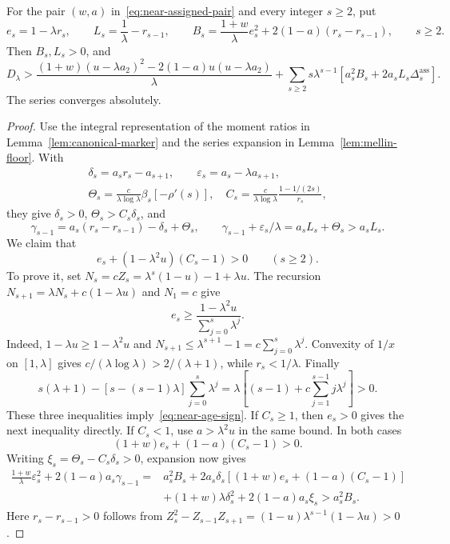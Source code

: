 \begin{lemma}\label{lem:near-absorption}
For the pair $(w,a)$ in~\eqref{eq:near-assigned-pair} and every integer $s\ge2$, put
\[
 e_s=1-\lambda r_s,\qquad L_s=\frac1\lambda-r_{s-1},\qquad
 B_s=\frac{1+w}{\lambda}e_s^2+2(1-a)(r_s-r_{s-1}),\qquad s\ge2.
\]
Then $B_s,L_s>0$, and
\begin{equation}\label{eq:near-root-floor}
 D_\lambda>
 \frac{(1+w)(u-\lambda a_2)^2-2(1-a)u(u-\lambda a_2)}\lambda
 +\sum_{s\ge2}s\lambda^{s-1}
       [a_s^2B_s+2a_sL_s\Delta_s^{\mathrm{ass}}].
\end{equation}
The series converges absolutely.
\end{lemma}
\begin{proof}
Use the integral representation of the moment ratios in Lemma~\ref{lem:canonical-marker} and the series expansion in Lemma~\ref{lem:mellin-floor}. With
\[\begin{gathered}
 \delta_s=a_sr_s-a_{s+1},\qquad \varepsilon_s=a_s-\lambda a_{s+1},\\
 \Theta_s=\frac c{\lambda\log\lambda}\beta_s[-\rho'(s)],\quad
 C_s=\frac c{\lambda\log\lambda}\frac{1-1/(2s)}{r_s},
\end{gathered}\]
they give $\delta_s>0$, $\Theta_s>C_s\delta_s$, and
\[
 \gamma_{s-1}=a_s(r_s-r_{s-1})-\delta_s+\Theta_s,
 \qquad \gamma_{s-1}+\varepsilon_s/\lambda=a_sL_s+\Theta_s>a_sL_s.
\]
We claim that
\begin{equation}\label{eq:near-age-sign}
 e_s+(1-\lambda^2u)(C_s-1)>0\qquad(s\ge2).
\end{equation}
To prove it, set $N_s=cZ_s=\lambda^s(1-u)-1+\lambda u$. The recursion
$N_{s+1}=\lambda N_s+c(1-\lambda u)$ and $N_1=c$ give
\[
 e_s\ge\frac{1-\lambda^2u}{\sum_{j=0}^s\lambda^j}.
\]
Indeed, $1-\lambda u\ge1-\lambda^2u$ and $N_{s+1}\le\lambda^{s+1}-1=c\sum_{j=0}^s\lambda^j$. Convexity of $1/x$ on $[1,\lambda]$ gives $c/(\lambda\log\lambda)>2/(\lambda+1)$, while $r_s<1/\lambda$. Finally
\[
 s(\lambda+1)-[s-(s-1)\lambda]\sum_{j=0}^s\lambda^j
 =\lambda\left[(s-1)+c\sum_{j=1}^{s-1}j\lambda^j\right]>0.
\]
These three inequalities imply~\eqref{eq:near-age-sign}. If $C_s\ge1$, then $e_s>0$ gives the next inequality directly. If $C_s<1$, use $a>\lambda^2u$ in the same bound. In both cases
\[
 (1+w)e_s+(1-a)(C_s-1)>0.
\]
Writing $\xi_s=\Theta_s-C_s\delta_s>0$, expansion now gives
\[
\begin{split}
 \frac{1+w}{\lambda}\varepsilon_s^2+2(1-a)a_s\gamma_{s-1}
 ={}&a_s^2B_s+2a_s\delta_s[(1+w)e_s+(1-a)(C_s-1)]\\
 &+(1+w)\lambda\delta_s^2+2(1-a)a_s\xi_s>a_s^2B_s.
\end{split}
\]
Here $r_s-r_{s-1}>0$ follows from $Z_s^2-Z_{s-1}Z_{s+1}=(1-u)\lambda^{s-1}(1-\lambda u)>0$.


\end{proof}
